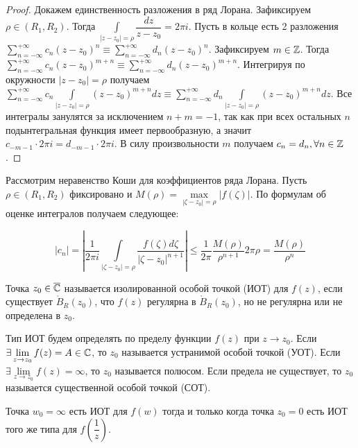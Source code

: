 \begin{proof}
    Докажем единственность разложения в ряд Лорана. Зафиксируем \(\rho \in (R_1, R_2)\). Тогда 
    \(\int\limits_{|z-z_0| = \rho} \dfrac{dz}{z-z_0} = 2 \pi i\). Пусть в кольце есть 2 разложения
    \(\sum\limits_{n = -\infty}^{+\infty} c_n (z-z_0)^n \equiv \sum\limits_{n = -\infty}^{+\infty} 
    d_n (z-z_0)^n\). Зафиксируем \(m \in \mathbb{Z}\). Тогда \(\sum\limits_{n = -\infty}^{+\infty} c_n 
    (z-z_0)^{m+n} \equiv \sum\limits_{n = -\infty}^{+\infty} d_n (z-z_0)^{m+n}\). Интегрируя по 
    окружности \(|z-z_0| = \rho\) получаем \(\sum\limits_{n = -\infty}^{+\infty} c_n 
    \int\limits_{|z-z_0| = \rho} (z-z_0)^{m+n} dz \equiv \sum\limits_{n = -\infty}^{+\infty} d_n 
    \int\limits_{|z-z_0| = \rho}(z-z_0)^{m+n} dz\). Все интегралы занулятся за исключением \(n+m = 
    -1\), так как при всех остальных \(n\) подынтегральная функция имеет первообразную, а значит
    \(c_{-m-1} \cdot 2 \pi i = d_{-m-1} \cdot 2 \pi i\). В силу произвольности \(m\) получаем
    \(c_n = d_n, \forall n \in \mathbb{Z}\).
\end{proof}

Рассмотрим неравенство Коши для коэффициентов ряда Лорана. Пусть \(\rho \in (R_1, R_2)\) фиксировано
и \(M(\rho) = \max\limits_{|\zeta - z_0| = \rho} |f(\zeta)|\). По формулам об оценке интегралов
получаем следующее:

\[|c_n| = \left|\dfrac{1}{2 \pi i} \int\limits_{|\zeta - z_0| = \rho} \dfrac{f(\zeta) d\zeta}{|\zeta
- z_0|^{n+1}}\right| \le \dfrac{1}{2 \pi} \dfrac{M(\rho)}{\rho^{n+1}} 2\pi \rho = 
\dfrac{M(\rho)}{\rho^{n}}\]



\begin{definition}
    Точка \(z_0 \in \overline{\mathbb{C}}\) называется изолированной особой точкой (ИОТ) для \(f(z)\), если 
    существует \(\mathring{B}_R(z_0)\), что \(f(z)\) регулярна в \(\mathring{B}_R(z_0)\), но не
    регулярна или не определена в \(z_0\).
\end{definition}

Тип ИОТ будем определять по пределу функции \(f(z)\) при \(z \rightarrow z_0\). Если \(\exists 
\lim\limits_{z \rightarrow z_0} f(z) = A \in \mathbb{C}\), то \(z_0\) называется устранимой особой точкой 
(УОТ). Если \(\exists \lim\limits_{z \rightarrow z_0} f(z) = \infty\), то \(z_0\) называется 
полюсом. Если предела не существует, то \(z_0\) называется существенной особой точкой (СОТ).

\begin{statement}
    Точка \(w_0 = \infty\) есть ИОТ для \(f(w)\) тогда и только когда точка \(z_0 = 0\) есть ИОТ 
    того же типа для \(f(\dfrac{1}{z})\).
\end{statement}

